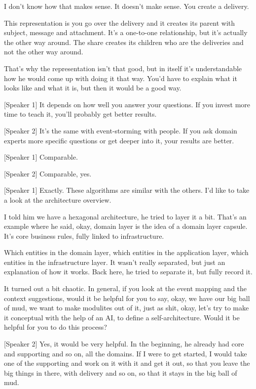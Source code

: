 I don't know how that makes sense. It doesn't make sense. You create a delivery.

This representation is you go over the delivery and it creates its parent with subject, message and attachment. It's a one-to-one relationship, but it's actually the other way around. The share creates its children who are the deliveries and not the other way around.

That's why the representation isn't that good, but in itself it's understandable how he would come up with doing it that way. You'd have to explain what it looks like and what it is, but then it would be a good way.

[Speaker 1]
It depends on how well you answer your questions. If you invest more time to teach it, you'll probably get better results.

[Speaker 2]
It's the same with event-storming with people. If you ask domain experts more specific questions or get deeper into it, your results are better.

[Speaker 1]
Comparable.

[Speaker 2]
Comparable, yes.

[Speaker 1]
Exactly. These algorithms are similar with the others. I'd like to take a look at the architecture overview.

I told him we have a hexagonal architecture, he tried to layer it a bit. That's an example where he said, okay, domain layer is the idea of a domain layer capsule. It's core business rules, fully linked to infrastructure.

Which entities in the domain layer, which entities in the application layer, which entities in the infrastructure layer. It wasn't really separated, but just an explanation of how it works. Back here, he tried to separate it, but fully record it.

It turned out a bit chaotic. In general, if you look at the event mapping and the context suggestions, would it be helpful for you to say, okay, we have our big ball of mud, we want to make modulites out of it, just as shit, okay, let's try to make it conceptual with the help of an AI, to define a self-architecture. Would it be helpful for you to do this process?

[Speaker 2]
Yes, it would be very helpful. In the beginning, he already had core and supporting and so on, all the domains. If I were to get started, I would take one of the supporting and work on it with it and get it out, so that you leave the big things in there, with delivery and so on, so that it stays in the big ball of mud.

